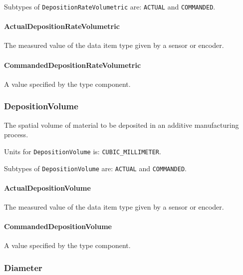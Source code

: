 Subtypes of \texttt{DepositionRateVolumetric} are: \texttt{ACTUAL} and \texttt{COMMANDED}. 
\FloatBarrier

\paragraph{ActualDepositionRateVolumetric}\mbox{}
\label{sec:ActualDepositionRateVolumetric}



The measured value of the data item type given by a sensor or encoder.


\paragraph{CommandedDepositionRateVolumetric}\mbox{}
\label{sec:CommandedDepositionRateVolumetric}



A value specified by the  type component.


\subsubsection{DepositionVolume}
\label{sec:DepositionVolume}



The spatial volume of material to be deposited in an additive manufacturing process.


Units for \texttt{DepositionVolume} is: \texttt{CUBIC_MILLIMETER}.


Subtypes of \texttt{DepositionVolume} are: \texttt{ACTUAL} and \texttt{COMMANDED}. 
\FloatBarrier

\paragraph{ActualDepositionVolume}\mbox{}
\label{sec:ActualDepositionVolume}



The measured value of the data item type given by a sensor or encoder.


\paragraph{CommandedDepositionVolume}\mbox{}
\label{sec:CommandedDepositionVolume}



A value specified by the  type component.


\subsubsection{Diameter}
\label{sec:Diameter}



